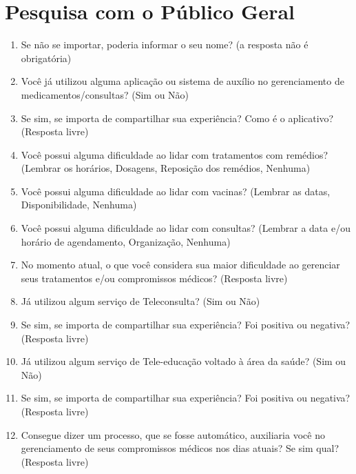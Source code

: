\section{Pesquisa com o Público Geral}
\begin{enumerate}
    \item Se não se importar, poderia informar o seu nome? (a resposta não é obrigatória)
    \item Você já utilizou alguma aplicação ou sistema de auxílio no gerenciamento de medicamentos/consultas? (Sim ou Não)
    \item Se sim, se importa de compartilhar sua experiência? Como é o aplicativo? (Resposta livre)
    \item Você possui alguma dificuldade ao lidar com tratamentos com remédios? (Lembrar os horários, Dosagens, Reposição dos remédios, Nenhuma)
    \item Você possui alguma dificuldade ao lidar com vacinas? (Lembrar as datas, Disponibilidade, Nenhuma)
    \item Você possui alguma dificuldade ao lidar com consultas? (Lembrar a data e/ou horário de agendamento, Organização, Nenhuma)
    \item No momento atual, o que você considera sua maior dificuldade ao gerenciar seus tratamentos e/ou compromissos médicos? (Resposta livre)
    \item Já utilizou algum serviço de Teleconsulta? (Sim ou Não)
    \item Se sim, se importa de compartilhar sua experiência? Foi positiva ou negativa? (Resposta livre)
    \item Já utilizou algum serviço de Tele-educação voltado à área da saúde? (Sim ou Não)
    \item Se sim, se importa de compartilhar sua experiência? Foi positiva ou negativa? (Resposta livre)
    \item Consegue dizer um processo, que se fosse automático, auxiliaria você no gerenciamento de seus compromissos médicos nos dias atuais? Se sim qual? (Resposta livre)
\end{enumerate}

